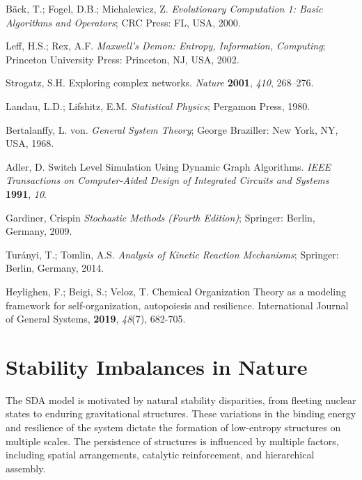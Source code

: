 \documentclass[preprint,12pt]{elsarticle}
\begin{document}
\begin{thebibliography}{999}
Bäck, T.; Fogel, D.B.; Michalewicz, Z. \textit{Evolutionary Computation 1: Basic Algorithms and Operators}; CRC Press: FL, USA, 2000.

Leff, H.S.; Rex, A.F. \textit{Maxwell's Demon: Entropy, Information, Computing}; Princeton University Press: Princeton, NJ, USA, 2002.

Strogatz, S.H. Exploring complex networks. \textit{Nature} \textbf{2001}, \textit{410}, 268–276.

Landau, L.D.; Lifshitz, E.M. \textit{Statistical Physics}; Pergamon Press, 1980.

Bertalanffy, L. von. \textit{General System Theory}; George Braziller: New York, NY, USA, 1968.

Adler, D. Switch Level Simulation Using Dynamic Graph Algorithms. \textit{IEEE Transactions on Computer-Aided Design of Integrated Circuits and Systems} \textbf{1991}, \textit{10}.

Gardiner, Crispin \textit{Stochastic Methods (Fourth Edition)}; Springer: Berlin, Germany, 2009.

Turányi, T.; Tomlin, A.S. \textit{Analysis of Kinetic Reaction Mechanisms}; Springer: Berlin, Germany, 2014.

Heylighen, F.; Beigi, S.; Veloz, T. Chemical Organization Theory as a modeling framework for self-organization, autopoiesis and resilience. International Journal of General Systems, \textbf{2019}, \textit{48}(7), 682-705.

\end{thebibliography}


\appendix

\section{Stability Imbalances in Nature}

The SDA model is motivated by natural stability disparities, from fleeting nuclear states to enduring gravitational structures. These variations in the binding energy and resilience of the system dictate the formation of low-entropy structures on multiple scales. The persistence of structures is influenced by multiple factors, including spatial arrangements, catalytic reinforcement, and hierarchical assembly.
\end{document}
